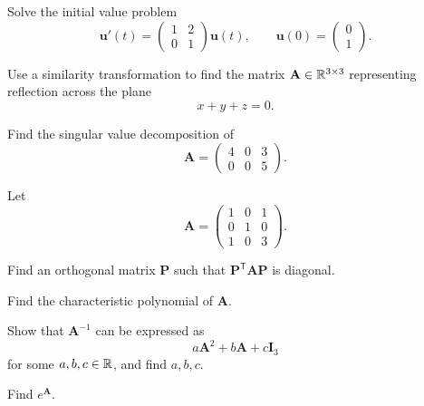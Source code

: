 \documentclass[11pt,oneside]{article}
\begin{document}
\begin{problem}
Solve the initial value problem
\[
\mathbf u'(t)=
\begin{pmatrix}
1&2\\
0&1
\end{pmatrix}\mathbf u(t),
\qquad
\mathbf u(0)=
\begin{pmatrix}
0\\1
\end{pmatrix}.
\]
\end{problem}

\begin{problem}
Use a similarity transformation to find the matrix $\mathbf A\in\mathbb{R}^{3\times3}$ representing reflection across the plane
\[
x+y+z=0.
\]
\end{problem}

\begin{problem}
Find the singular value decomposition of
\[
\mathbf A=
\begin{pmatrix}
4&0&3\\
0&0&5
\end{pmatrix}.
\]
\end{problem}

\begin{problem}
Let
\[
\mathbf A=
\begin{pmatrix}
1&0&1\\
0&1&0\\
1&0&3
\end{pmatrix}.
\]
\begin{problemsubparts}
\item Find an orthogonal matrix $\mathbf P$ such that $\mathbf P^{\mathsf T}\mathbf A\mathbf P$ is diagonal.
\item Find the characteristic polynomial of $\mathbf A$.
\item Show that $\mathbf A^{-1}$ can be expressed as
\[
a\mathbf A^2+b\mathbf A+c\mathbf I_3
\]
for some $a,b,c\in\mathbb{R}$, and find $a,b,c$.
\item Find $e^{\mathbf A}$.
\end{problemsubparts}
\end{problem}
\end{document}
